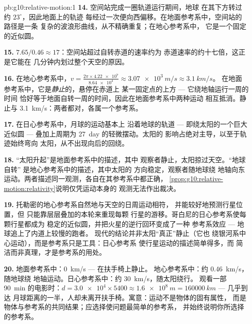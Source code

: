 \begin{solution}{pb:g10:relative-motion:1}
\textbf{14.} 空间站完成一圈轨道运行期间，地球
在其下方转过约 $23^\circ$，因此地面上的轨迹
每经过一次便向西偏移。在地面参考系中，空间站的路径是一条
复杂的波浪形曲线，从不精确重复；在地心参考系中，
它是一个固定的近似圆。

\textbf{15.} $7.65 / 0.46 \approx 17$：空间站超过自转赤道的速率约为
赤道速率的约十七倍，这正是它能在
几分钟内划过整个天空的原因。

\textbf{16.} 在地心参考系中，$v = \frac{2\pi \times \num{4.22e7}}{\num{8.64e4}}
\approx \qty{3.07e3}{m/s} \approx \qty{3.1}{km/s}$。
在地面参考系中，它是\emph{静止}的，悬停在赤道上
某一固定点的上方 --- 它绕地轴运行一周的时间
恰好等于地面自转一周的时间，因此在地面参考系中两种运动
相互抵消。静止与 \qty{3.1}{km/s}：两者都对，各属一个参考系。

\textbf{17.} 在日心参考系中，月球的运动基本上
沿着地球的轨道 --- 即绕太阳的一个巨大近似圆 ---
叠加上周期为 \qty{27}{day} 的轻微摆动。太阳的
影响占绝对主导，以至于轨迹始终弯向
太阳，从不出现向后的回绕。

\textbf{18.} “太阳升起”是地面参考系中的描述，其中
观察者静止，太阳掠过天空。“地球自转”
是地心参考系中的描述，其中太阳的
方向稳定，观察者随地球绕
地轴向东运动。两者描述同一观测，各自在其参考系中都正确，
\cref{prop:g10:relative-motion:relativity}说明仅凭运动本身的
观测无法作出裁决。

\textbf{19.} 托勒密的地心参考系自然地与天空的日周运动相符，
并能较好地预测行星位置，但
只能靠层层叠加的本轮来重现每颗
行星的游移。哥白尼的日心参考系使每颗行星都成为
稳定的近似圆，并把火星的逆行回环变成了一种
参考系效应 --- 地球追上了内道上较慢的跑者。
现代的结论并非太阳“真正”静止（它也
绕银河系中心运动），而是参考系只是工具：日心参考系
使行星运动的描述简单得多，而
简洁而非真理，才是参考系的用处。

\textbf{20.} 地面参考系中：\qty{0}{km/s} --- 在扶手椅上静止。
地心参考系中：约 \qty{0.46}{km/s}，随地球绕
地轴运动。日心参考系中：约 \qty{30}{km/s}，随太阳绕行。
观看一部 \qty{90}{min} 的电影时：$d = \num{3.0e4} \times 5400
\approx \qty{1.6e8}{m} = \qty{160000}{km}$ --- 几乎到达
月球距离的一半，人却未离开扶手椅。寓意：运动不是物体的固有属性，
而是物体与参考系的共同结果；应选择使问题最简单的参考系，
并始终说明你所选择的参考系。
\end{solution}
